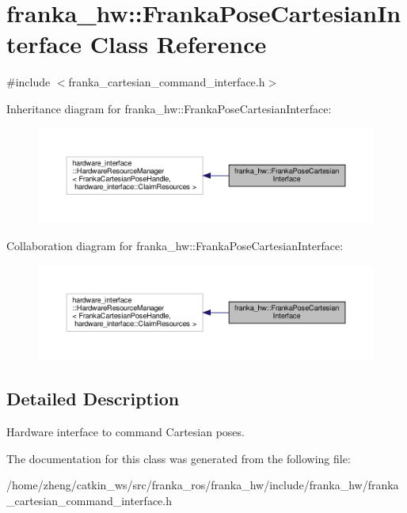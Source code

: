 \hypertarget{classfranka__hw_1_1_franka_pose_cartesian_interface}{}\section{franka\+\_\+hw\+:\+:Franka\+Pose\+Cartesian\+Interface Class Reference}
\label{classfranka__hw_1_1_franka_pose_cartesian_interface}


{\ttfamily \#include $<$franka\+\_\+cartesian\+\_\+command\+\_\+interface.\+h$>$}



Inheritance diagram for franka\+\_\+hw\+:\+:Franka\+Pose\+Cartesian\+Interface\+:
\nopagebreak
\begin{figure}[H]
\begin{center}
\leavevmode
\includegraphics[width=350pt]{classfranka__hw_1_1_franka_pose_cartesian_interface__inherit__graph}
\end{center}
\end{figure}


Collaboration diagram for franka\+\_\+hw\+:\+:Franka\+Pose\+Cartesian\+Interface\+:
\nopagebreak
\begin{figure}[H]
\begin{center}
\leavevmode
\includegraphics[width=350pt]{classfranka__hw_1_1_franka_pose_cartesian_interface__coll__graph}
\end{center}
\end{figure}


\subsection{Detailed Description}
Hardware interface to command Cartesian poses. 

The documentation for this class was generated from the following file\+:\begin{DoxyCompactItemize}
\item 
/home/zheng/catkin\+\_\+ws/src/franka\+\_\+ros/franka\+\_\+hw/include/franka\+\_\+hw/franka\+\_\+cartesian\+\_\+command\+\_\+interface.\+h\end{DoxyCompactItemize}
